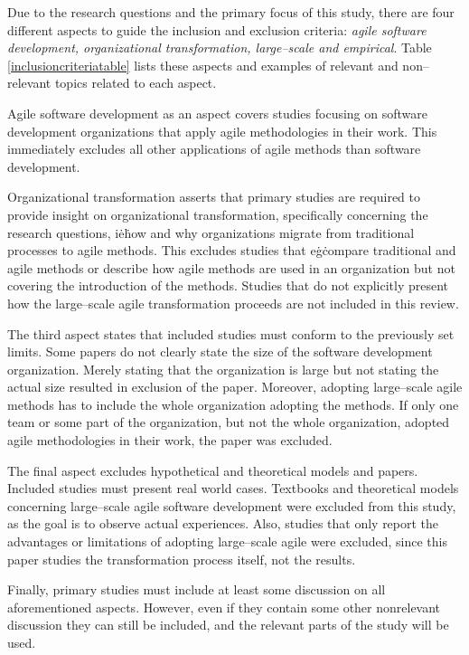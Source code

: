 Due to the research questions and the primary focus of this study, there are
four different aspects to guide the inclusion and exclusion criteria:
\textit{agile software development, organizational transformation, large–scale
and empirical}. Table \ref{inclusioncriteriatable} lists these aspects and examples of relevant and
non–relevant topics related to each aspect.

\pagebreak

\vspace{1.5cm}

Agile software development as an aspect covers studies focusing on
software development organizations that apply agile methodologies in
their work. This immediately excludes all other applications of agile
methods than software development.

Organizational transformation asserts that primary studies are required
to provide insight on organizational transformation, specifically
concerning the research questions, i\.e\. how and why organizations
migrate from traditional processes to agile methods. This excludes
studies that e\.g\. compare traditional and agile methods or describe
how agile methods are used in an organization but not covering the
introduction of the methods. Studies that do not explicitly present how
the large–scale agile transformation proceeds are not included in this
review.

The third aspect states that included studies must conform to the
previously set limits. Some papers do not clearly state the size of the
software development organization. Merely stating that the organization
is large but not stating the actual size resulted in exclusion of the
paper. Moreover, adopting large–scale agile methods has to include the
whole organization adopting the methods. If only one team or some part
of the organization, but not the whole organization, adopted agile
methodologies in their work, the paper was excluded.

The final aspect excludes hypothetical and theoretical models and
papers. Included studies must present real world cases. Textbooks
and theoretical models concerning large–scale agile software
development were excluded from this study, as the goal is to observe
actual experiences. Also, studies that only report the advantages or
limitations of adopting large–scale agile were excluded, since this
paper studies the transformation process itself, not the results.

Finally, primary studies must include at least some discussion on
all aforementioned aspects. However, even if they contain some other
nonrelevant discussion they can still be included, and the relevant
parts of the study will be used.
